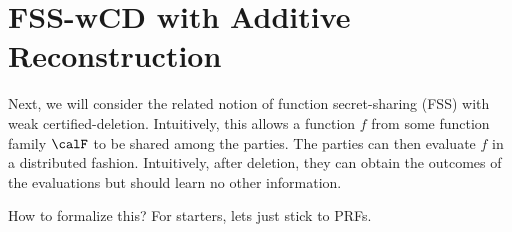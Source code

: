 \section{FSS-wCD with Additive Reconstruction}\label{sec:hss-cd}

Next, we will consider the related notion of function secret-sharing
(FSS) with weak certified-deletion. Intuitively, this allows a
function $f$ from some function family $\calF$ to be shared among
the parties. The parties can then evaluate $f$ in a distributed
fashion. Intuitively, after deletion, they can obtain the outcomes
of the evaluations but should learn no other information.

How to formalize this? For starters, lets just stick to PRFs.

